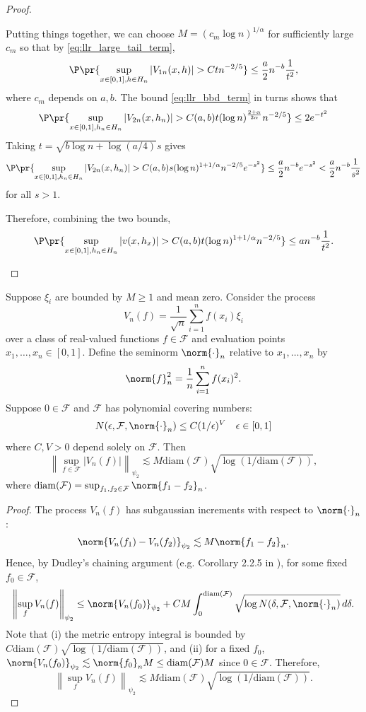\documentclass[12pt, reqno]{amsart}
\newcommand{\normauto}[1]{\left\lVert #1 \right\rVert}
\numberwithin{equation}{section}
\begin{document}
\begin{refsection}
\begin{appendices}
\begin{proof}
\begin{enumerate}[wide]
Putting things together, we can choose $M = (c_m \log n)^{1/\alpha}$ for sufficiently
large $c_m$ so that by \eqref{eq:llr_large_tail_term}, \[
\P\pr{\sup_{x \in [0,1], h \in H_n} |V_{1n}(x,h)| > C  t n^{-2/5}} \le \frac{a}{2} n^{-b}
\frac{1}
{t^2},
\]
where $c_m$ depends on $a,b$.
The bound \eqref{eq:llr_bbd_term} in turns shows that \[
\P\pr{
  \sup_{x \in [0,1], h_n \in H_n} |V_{2n}(x,h_n)| > C(a,b) t (\log n)^{\frac{2 + \alpha}
  {2
  \alpha}} n^{-2/5}
} \le 2 e^{-t^2}
\]
Taking $t = \sqrt{b\log n + \log(a/4)} s$ gives \[
\P\pr{
  \sup_{x \in [0,1], h_n \in H_n} |V_{2n}(x,h_n)| > C(a,b) s (\log n)^{1 + 1/\alpha} n^
  {-2/5}
  e^
  {-s^2}
} \le \frac{a}{2} n^{-b} e^{-s^2} < \frac{a}{2} n^{-b} \frac{1}{s^2}
\]
for all $s > 1$.

Therefore, combining the two bounds, \[
\P\pr{
  \sup_{x\in [0,1], h_n \in H_n} |v(x, h_x)| > C(a,b) t (\log n)^{1 + 1/\alpha} n^{-2/5}
} \le a n^{-b} \frac{1}{t^2}.
\]
\end{enumerate}
\end{proof}

\begin{lemma}
\label{lemma:dudley}
Suppose $\xi_i$ are bounded by $M \ge 1$ and mean zero. Consider the process \[
V_n(f) = \frac{1}{\sqrt{n}}\sum_{i=1}^n f(x_i) \xi_{i}
\]
over a class of real-valued functions $f \in \mathcal F$ and evaluation points
$x_1,\ldots, x_n \in [0,1]$.
Define the seminorm $\norm{\cdot}_n$
relative to $x_1,\ldots, x_n$ by \[
\norm{f}_n^2 = \frac{1}{n} \sum_{i=1}^n f(x_i)^2.
\]
Suppose $0 \in \mathcal F$ and
$\mathcal F$ has
polynomial covering numbers: \[N(\epsilon,
\mathcal F, \norm{\cdot}_n) \le C (1/\epsilon)^
{V} \quad \epsilon \in [0,1]\]
where $C, V > 0$ depend solely on $\mathcal F$.
Then \[
\normauto{\sup_{f\in \mathcal F} |V_n(f)|}_{\psi_2} \lesssim M \mathrm{diam}(\mathcal F)
\sqrt{\log (1/\mathrm{diam}(\mathcal F))},
\]
where $\mathrm{diam}(\mathcal F) = \sup_{f_1, f_2 \in \mathcal F} \norm{f_1 - f_2}_n$.
\end{lemma}

\begin{proof}
The process $V_n(f)$ has subgaussian increments with respect to $\norm{\cdot}_n$: \[
\norm{V_n(f_1) - V_n(f_2)}_{\psi_2} \lesssim M \norm{f_1 - f_2}_n.
\]
Hence, by Dudley's chaining argument (e.g. Corollary 2.2.5 in \citet{vaart1996weak}), for
some fixed $f_0 \in \mathcal F$, \[
\normauto{\sup_{f} V_n(f)}_{\psi_2} \le \norm{V_n(f_0)}_{\psi_2} + CM \int_0^{
\mathrm{diam}(\mathcal F)} \sqrt{\log N(\delta, \mathcal F, \norm{\cdot}_n)} \,d \delta.
\]
Note that (i) the metric entropy
integral is bounded by $C \mathrm{diam}(\mathcal F)
\sqrt{\log (1/\mathrm{diam}(\mathcal F))}$, and (ii) for a fixed $f_0$, $\norm{V_n(f_0)}_
{\psi_2} \lesssim \norm{f_0}_n M \le \mathrm{diam}(\mathcal F) M$ since $0 \in \mathcal
F$. Therefore, \[
\normauto{\sup_{f} V_n(f)}_{\psi_2} \lesssim M \mathrm{diam}(\mathcal F)
\sqrt{\log (1/\mathrm{diam}(\mathcal F))}.
\]
\end{proof}


\end{appendices}
\end{refsection}
\end{document}

